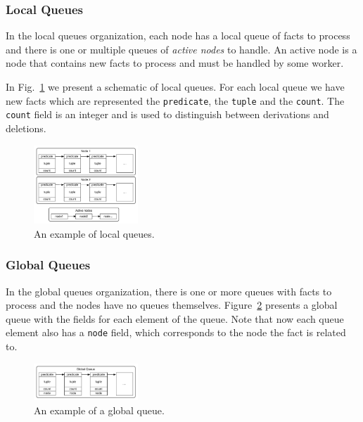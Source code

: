 \documentclass[preprint]{sigplanconf}
\begin{document}
\subsubsection{Local Queues}

In the local queues organization, each node has a local queue of facts to process and
there is one or multiple queues of \emph{active nodes} to handle.
An active node is a node that contains new facts to process and must be handled by some worker.

In Fig.~\ref{fig:localqueues} we present a schematic of local queues. For each local queue
we have new facts which are represented the \texttt{predicate}, the \texttt{tuple} and the
\texttt{count}. The \texttt{count} field is an integer and is used to distinguish between
derivations and deletions.

\begin{figure}[ht]
  \centering
    \includegraphics[width=0.35\textwidth]{figures/localqueues.pdf}
  \caption{An example of local queues.}
  \label{fig:localqueues}
\end{figure}

\subsubsection{Global Queues}

In the global queues organization, there is one or more queues with facts to process
and the nodes have no queues themselves. Figure~\ref{fig:globalqueue} presents a
global queue with the fields for each element of the queue. Note that now each queue element
also has a \texttt{node} field, which corresponds to the node the fact is related to.

\begin{figure}[ht]
  \centering
    \includegraphics[width=0.35\textwidth]{figures/globalqueue.pdf}
  \caption{An example of a global queue.}
  \label{fig:globalqueue}
\end{figure}
\end{document}
